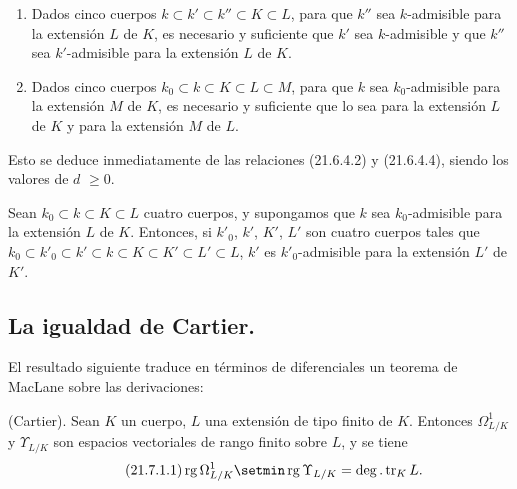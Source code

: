 \begin{corollary}[21.6.5]
\label{0.21.6.5-fr}
\begin{enumerate}
  \item[\textup{(i)}] Dados cinco cuerpos $k\subset k'\subset k''\subset K\subset L$,
  para que $k''$ sea $k$-admisible para la extensión $L$ de $K$, es necesario y
  suficiente que $k'$ sea $k$-admisible y que $k''$ sea $k'$-admisible
  para la extensión $L$ de $K$.
  \item[\textup{(ii)}] Dados cinco cuerpos
  $k_0\subset k\subset K\subset L\subset M$, para que $k$ sea
  $k_0$-admisible para la extensión $M$ de $K$, es necesario y suficiente que lo
  sea para la extensión $L$ de $K$ y para la extensión $M$ de $L$.
\end{enumerate}
\end{corollary}

Esto se deduce inmediatamente de las relaciones (21.6.4.2) y (21.6.4.4), siendo
los valores de $d$ $\geqslant0$.

\begin{corollary}[21.6.6]
\label{0.21.6.6-fr}
Sean $k_0\subset k\subset K\subset L$ cuatro cuerpos, y supongamos que $k$
sea $k_0$-admisible para la extensión $L$ de $K$. Entonces, si $k'_0$, $k'$,
$K'$, $L'$ son cuatro cuerpos tales que
$k_0\subset k'_0\subset k'\subset k\subset K\subset K'\subset L'\subset L$,
$k'$ es $k'_0$-admisible para la extensión $L'$ de $K'$.
\end{corollary}

\subsection{La igualdad de Cartier.}
\label{subsection:0.21.7-fr}

El resultado siguiente traduce en términos de diferenciales un teorema de
MacLane sobre las derivaciones:

\begin{theorem}[21.7.1]
\label{0.21.7.1-fr}
\textnormal{(Cartier).}
Sean $K$ un cuerpo, $L$ una extensión de tipo finito de $K$. Entonces
$\Omega^1_{L/K}$ y $\Upsilon_{L/K}$ son espacios vectoriales de rango
finito sobre $L$, y se tiene
\begin{equation}
\tag{21.7.1.1}
\label{0.21.7.1.1-fr}
\operatorname{rg}\Omega^1_{L/K}\setmin\operatorname{rg}\Upsilon_{L/K}
=\deg.\operatorname{tr}_K L.
\end{equation}
\end{theorem}

